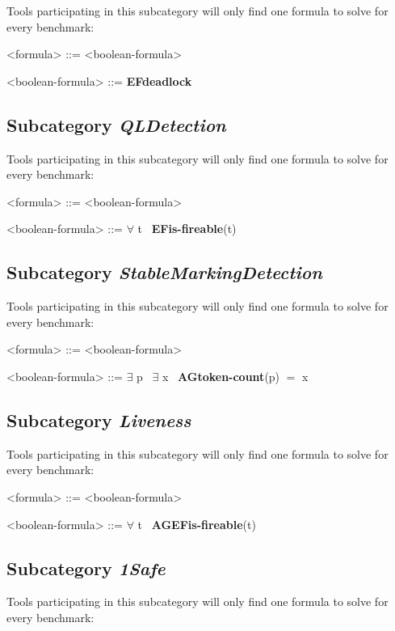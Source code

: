 \documentclass[10pt,english,a4paper]{article}
\newcommand\ctla             {\textbf{A}\xspace}
\newcommand\ctle             {\textbf{E}\xspace}
\newcommand\ltlf             {\textbf{F}\xspace}
\newcommand\ltlg             {\textbf{G}\xspace}
\newcommand\quantexist       {\boldmath$\exists$\xspace}
\newcommand\quantall         {\boldmath$\forall$\xspace}
\newcommand\atomeq          {\boldmath$=$\xspace}
\newcommand\atomdead         {\textbf{deadlock}\xspace}
\newcommand\atomisfire[1]    {\textbf{is-fireable}(#1)}
\newcommand\atomtokenscnt[1] {\textbf{token-count}(#1)}
\newcommand\mysubsection[1]{\color{sectioncolor}\subsection{#1}\color{defaultcolor}}
\begin{document}
Tools participating in this subcategory will only find one formula to solve
for every benchmark:

\begin{grammar}

<formula> ::= <boolean-formula>

<boolean-formula> ::= \ctle \ltlf \atomdead

\end{grammar}

\mysubsection{Subcategory \textit{QLDetection}}

Tools participating in this subcategory will only find one formula to solve
for every benchmark:

\begin{grammar}

<formula> ::= <boolean-formula>

<boolean-formula> ::= \quantall t~ \ctle \ltlf \atomisfire{t}

\end{grammar}

\mysubsection{Subcategory \textit{StableMarkingDetection}}

Tools participating in this subcategory will only find one formula to solve
for every benchmark:

\begin{grammar}

<formula> ::= <boolean-formula>

<boolean-formula> ::= \quantexist p~ \quantexist x~ \ctla \ltlg \atomtokenscnt{p} \atomeq x

\end{grammar}

\mysubsection{Subcategory \textit{Liveness}}

Tools participating in this subcategory will only find one formula to solve
for every benchmark:

\begin{grammar}

<formula> ::= <boolean-formula>

<boolean-formula> ::= \quantall t~ \ctla \ltlg \ctle \ltlf \atomisfire{t}

\end{grammar}

\mysubsection{Subcategory \textit{1Safe}}

Tools participating in this subcategory will only find one formula to solve
for every benchmark:
\end{document}
